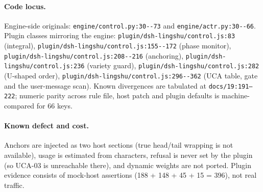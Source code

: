 \paragraph{Code locus.} Engine-side originals:
\texttt{engine/\allowbreak{}control.\allowbreak{}py:\allowbreak{}30-\allowbreak{}-\allowbreak{}73} and \texttt{engine/\allowbreak{}actr.\allowbreak{}py:\allowbreak{}30-\allowbreak{}-\allowbreak{}66}. Plugin
classes mirroring the engine:
\texttt{plugin/\allowbreak{}dsh-\allowbreak{}lingshu/\allowbreak{}control.\allowbreak{}js:\allowbreak{}83} (integral),
\texttt{plugin/\allowbreak{}dsh-\allowbreak{}lingshu/\allowbreak{}control.\allowbreak{}js:\allowbreak{}155-\allowbreak{}-\allowbreak{}172} (phase monitor),
\texttt{plugin/\allowbreak{}dsh-\allowbreak{}lingshu/\allowbreak{}control.\allowbreak{}js:\allowbreak{}208-\allowbreak{}-\allowbreak{}216} (anchoring),
\texttt{plugin/\allowbreak{}dsh-\allowbreak{}lingshu/\allowbreak{}control.\allowbreak{}js:\allowbreak{}236} (variety guard),
\texttt{plugin/\allowbreak{}dsh-\allowbreak{}lingshu/\allowbreak{}control.\allowbreak{}js:\allowbreak{}282} (U-shaped order),
\texttt{plugin/\allowbreak{}dsh-\allowbreak{}lingshu/\allowbreak{}control.\allowbreak{}js:\allowbreak{}296-\allowbreak{}-\allowbreak{}362} (UCA table, gate and the
user-message scan). Known divergences are tabulated at
\texttt{docs/19:191--222}; numeric parity across rule file, host patch and
plugin defaults is machine-compared for 66 keys.

\paragraph{Known defect and cost.} Anchors are injected as two host sections
(true head/tail wrapping is not available), usage is estimated from characters,
refusal is never set by the plugin (so UCA-03 is unreachable there), and dynamic
weights are not ported. Plugin evidence consists of mock-host assertions
(188 + 148 + 45 + 15 = 396), not real traffic.
